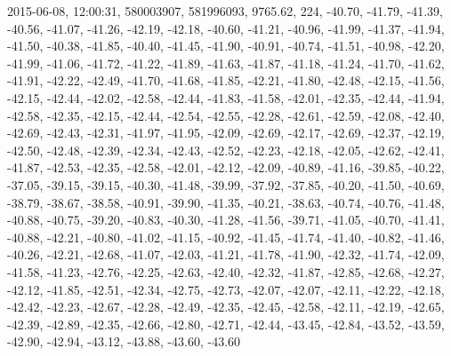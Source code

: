 2015-06-08, 12:00:31, 580003907, 581996093, 9765.62, 224, -40.70, -41.79, -41.39, -40.56, -41.07, -41.26, -42.19, -42.18, -40.60, -41.21, -40.96, -41.99, -41.37, -41.94, -41.50, -40.38, -41.85, -40.40, -41.45, -41.90, -40.91, -40.74, -41.51, -40.98, -42.20, -41.99, -41.06, -41.72, -41.22, -41.89, -41.63, -41.87, -41.18, -41.24, -41.70, -41.62, -41.91, -42.22, -42.49, -41.70, -41.68, -41.85, -42.21, -41.80, -42.48, -42.15, -41.56, -42.15, -42.44, -42.02, -42.58, -42.44, -41.83, -41.58, -42.01, -42.35, -42.44, -41.94, -42.58, -42.35, -42.15, -42.44, -42.54, -42.55, -42.28, -42.61, -42.59, -42.08, -42.40, -42.69, -42.43, -42.31, -41.97, -41.95, -42.09, -42.69, -42.17, -42.69, -42.37, -42.19, -42.50, -42.48, -42.39, -42.34, -42.43, -42.52, -42.23, -42.18, -42.05, -42.62, -42.41, -41.87, -42.53, -42.35, -42.58, -42.01, -42.12, -42.09, -40.89, -41.16, -39.85, -40.22, -37.05, -39.15, -39.15, -40.30, -41.48, -39.99, -37.92, -37.85, -40.20, -41.50, -40.69, -38.79, -38.67, -38.58, -40.91, -39.90, -41.35, -40.21, -38.63, -40.74, -40.76, -41.48, -40.88, -40.75, -39.20, -40.83, -40.30, -41.28, -41.56, -39.71, -41.05, -40.70, -41.41, -40.88, -42.21, -40.80, -41.02, -41.15, -40.92, -41.45, -41.74, -41.40, -40.82, -41.46, -40.26, -42.21, -42.68, -41.07, -42.03, -41.21, -41.78, -41.90, -42.32, -41.74, -42.09, -41.58, -41.23, -42.76, -42.25, -42.63, -42.40, -42.32, -41.87, -42.85, -42.68, -42.27, -42.12, -41.85, -42.51, -42.34, -42.75, -42.73, -42.07, -42.07, -42.11, -42.22, -42.18, -42.42, -42.23, -42.67, -42.28, -42.49, -42.35, -42.45, -42.58, -42.11, -42.19, -42.65, -42.39, -42.89, -42.35, -42.66, -42.80, -42.71, -42.44, -43.45, -42.84, -43.52, -43.59, -42.90, -42.94, -43.12, -43.88, -43.60, -43.60
